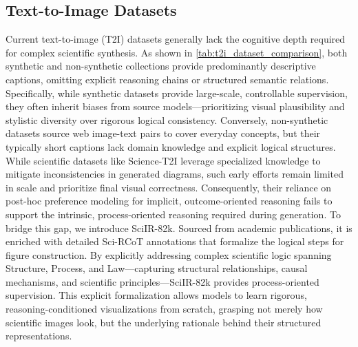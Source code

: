\documentclass[runningheads]{llncs}
\begin{document}
\subsection{Text-to-Image Datasets}

Current text-to-image (T2I) datasets generally lack the cognitive depth required for complex scientific synthesis. As shown in \cref{tab:t2i_dataset_comparison}, both synthetic and non-synthetic collections provide predominantly descriptive captions, omitting explicit reasoning chains or structured semantic relations. Specifically, while synthetic datasets \cite{sun2023journeydb,pixelprose24,fang2025flux,li2025science} provide large-scale, controllable supervision, they often inherit biases from source models—prioritizing visual plausibility and stylistic diversity over rigorous logical consistency. Conversely, non-synthetic datasets \cite{sidorov2020textcaps,changpinyo2021cc12m,OnoeDocci2024,schuhmann2022laion} source web image-text pairs to cover everyday concepts, but their typically short captions lack domain knowledge and explicit logical structures.
While scientific datasets like Science-T2I \cite{li2025science} leverage specialized knowledge to mitigate inconsistencies in generated diagrams, such early efforts remain limited in scale and prioritize final visual correctness. Consequently, their reliance on post-hoc preference modeling for implicit, outcome-oriented reasoning fails to support the intrinsic, process-oriented reasoning required during generation.
To bridge this gap, we introduce SciIR-82k. Sourced from academic publications, it is enriched with detailed Sci-RCoT annotations that formalize the logical steps for figure construction. By explicitly addressing complex scientific logic spanning Structure, Process, and Law—capturing structural relationships, causal mechanisms, and scientific principles—SciIR-82k provides process-oriented supervision. This explicit formalization allows models to learn rigorous, reasoning-conditioned visualizations from scratch, grasping not merely how scientific images look, but the underlying rationale behind their structured representations.
\end{document}

